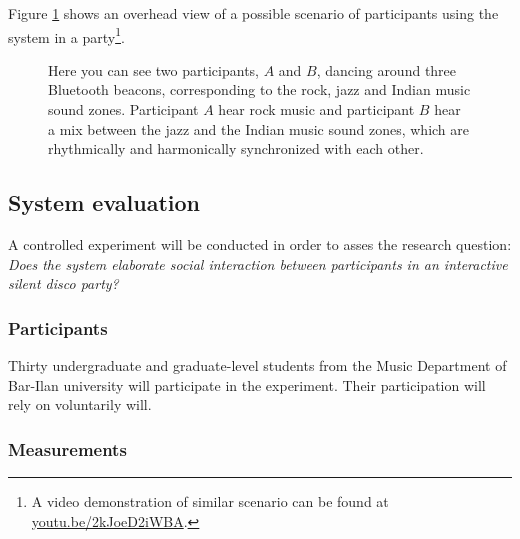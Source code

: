 \documentclass[a4paper,11pt]{article}
\begin{document}
Figure \ref{fig:sys:participant_view} shows an overhead view of a possible scenario of participants using the system in a party\footnote{A video demonstration of similar scenario can be found at \href{http://youtu.be/2kJoeD2iWBA}{youtu.be/2kJoeD2iWBA}.}.

\begin{figure}[!htb]
	\centering
	\def\svgwidth{0.9\textwidth}
	
	\caption{Here you can see two participants, $A$ and $B$, dancing around three Bluetooth beacons, corresponding to the rock, jazz and Indian music sound zones. Participant $A$ hear rock music and participant $B$ hear a mix between the jazz and the Indian music sound zones, which are rhythmically and harmonically synchronized with each other.}\label{fig:sys:participant_view}
\end{figure}

\subsection{System evaluation}\label{methods:evaluation}

A controlled experiment will be conducted in order to asses the research question: \emph{Does the system elaborate social interaction between participants in an interactive silent disco party?}

\subsubsection{Participants}

Thirty undergraduate and graduate-level students from the Music Department of Bar-Ilan university will participate in the experiment.
Their participation will rely on voluntarily will.

\subsubsection{Measurements}
\end{document}
